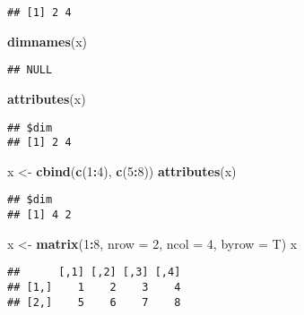 \documentclass[
  a4paper,
]{article}
\newenvironment{Shaded}{\begin{snugshade}}{\end{snugshade}}
\newcommand{\AttributeTok}[1]{\textcolor[rgb]{0.13,0.29,0.53}{#1}}
\newcommand{\DecValTok}[1]{\textcolor[rgb]{0.00,0.00,0.81}{#1}}
\newcommand{\FunctionTok}[1]{\textcolor[rgb]{0.13,0.29,0.53}{\textbf{#1}}}
\newcommand{\NormalTok}[1]{#1}
\newcommand{\OtherTok}[1]{\textcolor[rgb]{0.56,0.35,0.01}{#1}}
\newcommand{\SpecialCharTok}[1]{\textcolor[rgb]{0.81,0.36,0.00}{\textbf{#1}}}
\begin{document}
\begin{verbatim}
## [1] 2 4
\end{verbatim}

\begin{Shaded}
\begin{Highlighting}[]
\FunctionTok{dimnames}\NormalTok{(x)}
\end{Highlighting}
\end{Shaded}

\begin{verbatim}
## NULL
\end{verbatim}

\begin{Shaded}
\begin{Highlighting}[]
\FunctionTok{attributes}\NormalTok{(x)}
\end{Highlighting}
\end{Shaded}

\begin{verbatim}
## $dim
## [1] 2 4
\end{verbatim}

\begin{Shaded}
\begin{Highlighting}[]
\NormalTok{x }\OtherTok{\textless{}{-}} \FunctionTok{cbind}\NormalTok{(}\FunctionTok{c}\NormalTok{(}\DecValTok{1}\SpecialCharTok{:}\DecValTok{4}\NormalTok{), }\FunctionTok{c}\NormalTok{(}\DecValTok{5}\SpecialCharTok{:}\DecValTok{8}\NormalTok{))}
\FunctionTok{attributes}\NormalTok{(x)}
\end{Highlighting}
\end{Shaded}

\begin{verbatim}
## $dim
## [1] 4 2
\end{verbatim}

\begin{Shaded}
\begin{Highlighting}[]
\NormalTok{x }\OtherTok{\textless{}{-}} \FunctionTok{matrix}\NormalTok{(}\DecValTok{1}\SpecialCharTok{:}\DecValTok{8}\NormalTok{, }\AttributeTok{nrow =} \DecValTok{2}\NormalTok{, }\AttributeTok{ncol =} \DecValTok{4}\NormalTok{, }\AttributeTok{byrow =}\NormalTok{ T)}
\NormalTok{x}
\end{Highlighting}
\end{Shaded}

\begin{verbatim}
##      [,1] [,2] [,3] [,4]
## [1,]    1    2    3    4
## [2,]    5    6    7    8
\end{verbatim}
\end{document}
